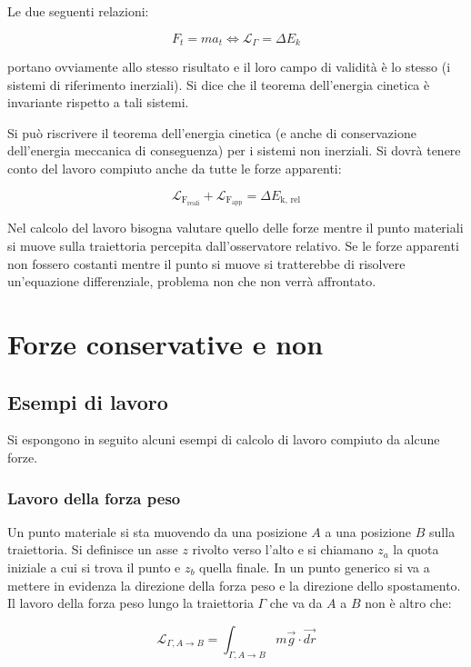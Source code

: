 Le due seguenti relazioni:

\[
	\boxed{F_t=ma_t \iff \mathcal{L}_\Gamma=\Delta E_k}
\]

portano ovviamente allo stesso risultato e il loro campo di validità è lo stesso (i sistemi di riferimento inerziali). Si dice che il teorema dell'energia cinetica è invariante rispetto a tali sistemi.

Si può riscrivere il teorema dell'energia cinetica (e anche di conservazione dell'energia meccanica di conseguenza) per i sistemi non inerziali. Si dovrà tenere conto del lavoro compiuto anche da tutte le forze apparenti:

\[
	\mathcal{L}_{\text{F}_{\text{reali}}}+\mathcal{L}_{\text{F}_{\text{app}}}=\Delta E_{ \text{k, rel}}
\]

Nel calcolo del lavoro bisogna valutare quello delle forze mentre il punto materiali si muove sulla traiettoria percepita dall'osservatore relativo. Se le forze apparenti non fossero costanti mentre il punto si muove si tratterebbe di risolvere un'equazione differenziale, problema non che non verrà affrontato.

\section{Forze conservative e non}

\subsection{Esempi di lavoro}

Si espongono in seguito alcuni esempi di calcolo di lavoro compiuto da alcune forze.

\subsubsection{Lavoro della forza peso}

Un punto materiale si sta muovendo da una posizione $A$ a una posizione $B$ sulla traiettoria. Si definisce un asse $z$ rivolto verso l'alto e si chiamano $z_a$ la quota iniziale a cui si trova il punto e $z_b$ quella finale. In un punto generico si va a mettere in evidenza la direzione della forza peso e la direzione dello spostamento. Il lavoro della forza peso lungo la traiettoria $\Gamma$ che va da $A$ a $B$ non è altro che:

\[
	\mathcal{L}_{\Gamma, A \to B}=\int_{\Gamma, A \to B} m\vec{g} \cdot \vec{dr}
\]

